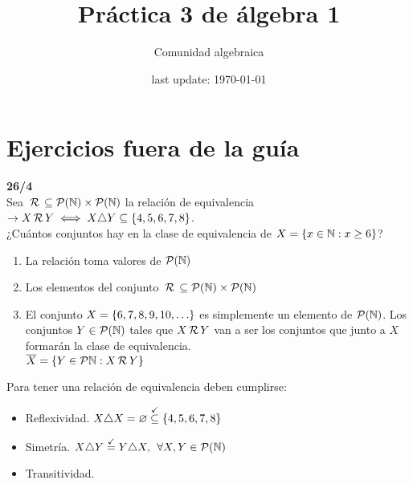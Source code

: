 




\title{Práctica 3 de álgebra 1} %
\author{Comunidad algebraica} %
\date{last update: \today} %
\section*{Ejercicios fuera de la guía}
\textbf{26/4}\\
Sea $\,\mathcal{R}\, \subseteq \mathcal P(\mathbb N) \times \mathcal P(\mathbb N)$ la relación de equivalencia
$\to X \,\mathcal{R}\, Y \iff X \triangle Y \subseteq \left\{ 4,5,6,7,8 \right\}$.\\
¿Cuántos conjuntos hay en la clase de equivalencia de $X = \left\{ x \in \mathbb N : x \geq 6 \right\}$?

\separadorCorto

\begin{enumerate}
	\item La relación toma valores de $\mathcal P(\mathbb N)$

	\item Los elementos del conjunto $\,\mathcal{R}\, \subseteq \mathcal P(\mathbb N) \times \mathcal P(\mathbb N)$

	\item El conjunto $X = \set{\foreach \i in {6,...,10}{\i, }\dots}$ es simplemente un elemento de $\mathcal P(\mathbb N)$.
	      Los conjuntos $Y \in \mathcal P(\mathbb N)$ tales que $X \,\mathcal{R}\, Y$ van a ser los conjuntos que junto a $X$ formarán la
	      clase de equivalencia.\\
	      $ \overline{X} = \left\{ Y \in \mathcal P{\mathbb N} : X \,\mathcal{R}\, Y \right\}$
\end{enumerate}

Para tener una relación de equivalencia deben cumplirse:
\begin{itemize}
	\item Reflexividad. $X \triangle X = \varnothing \stackrel{\checkmark}\subseteq \left\{ 4,5,6,7,8 \right\}$
	\item Simetría. $X \triangle Y \stackrel{\checkmark}= Y \triangle X,\, \;\forall X,Y \in \mathcal P(\mathbb N)$
	\item Transitividad.
\end{itemize}

